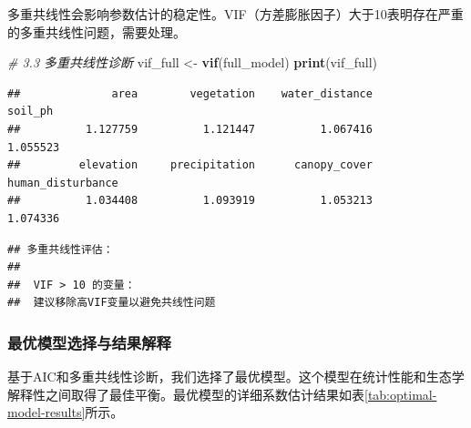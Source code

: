 \documentclass[
  twoside,12pt,fontset=none]{ctexbook}
\newenvironment{Shaded}{\begin{snugshade}}{\end{snugshade}}
\newcommand{\AttributeTok}[1]{\textcolor[rgb]{0.13,0.29,0.53}{#1}}
\newcommand{\CommentTok}[1]{\textcolor[rgb]{0.56,0.35,0.01}{\textit{#1}}}
\newcommand{\ConstantTok}[1]{\textcolor[rgb]{0.56,0.35,0.01}{#1}}
\newcommand{\FunctionTok}[1]{\textcolor[rgb]{0.13,0.29,0.53}{\textbf{#1}}}
\newcommand{\NormalTok}[1]{#1}
\newcommand{\OtherTok}[1]{\textcolor[rgb]{0.56,0.35,0.01}{#1}}
\newcommand{\SpecialCharTok}[1]{\textcolor[rgb]{0.81,0.36,0.00}{\textbf{#1}}}
\newcommand{\StringTok}[1]{\textcolor[rgb]{0.31,0.60,0.02}{#1}}
\begin{document}
多重共线性会影响参数估计的稳定性。VIF（方差膨胀因子）大于10表明存在严重的多重共线性问题，需要处理。

\begin{Shaded}
\begin{Highlighting}[]
\CommentTok{\# 3.3 多重共线性诊断}
\NormalTok{vif\_full }\OtherTok{\textless{}{-}} \FunctionTok{vif}\NormalTok{(full\_model)}
\FunctionTok{print}\NormalTok{(vif\_full)}
\end{Highlighting}
\end{Shaded}

\begin{verbatim}
##              area        vegetation    water_distance           soil_ph 
##          1.127759          1.121447          1.067416          1.055523 
##         elevation     precipitation      canopy_cover human_disturbance 
##          1.034408          1.093919          1.053213          1.074336
\end{verbatim}

\begin{verbatim}
## 多重共线性评估：
## 
##  VIF > 10 的变量：  
##  建议移除高VIF变量以避免共线性问题
\end{verbatim}

\hypertarget{ux6700ux4f18ux6a21ux578bux9009ux62e9ux4e0eux7ed3ux679cux89e3ux91ca}{%
\subsubsection{最优模型选择与结果解释}\label{ux6700ux4f18ux6a21ux578bux9009ux62e9ux4e0eux7ed3ux679cux89e3ux91ca}}

基于AIC和多重共线性诊断，我们选择了最优模型。这个模型在统计性能和生态学解释性之间取得了最佳平衡。最优模型的详细系数估计结果如表\ref{tab:optimal-model-results}所示。

\begin{Shaded}
\end{Shaded}
\end{document}
